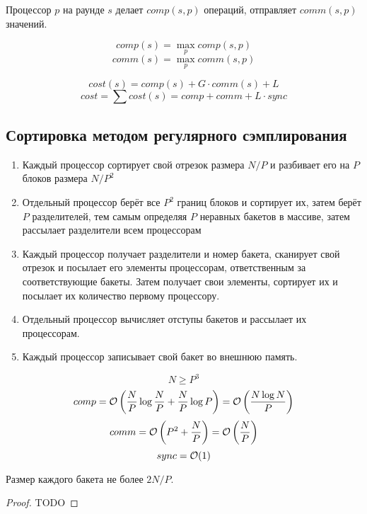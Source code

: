 Процессор $p$ на раунде $s$
делает $comp(s, p)$ операций,
отправляет $comm(s, p)$ значений.

\[ comp(s) = \max_p comp(s, p) \]
\[ comm(s) = \max_p comm(s, p) \]

\[ cost(s) = comp(s) + G \cdot comm(s) + L \]
\[ cost = \sum cost(s) = comp + comm + L \cdot sync \]

\subsection{Сортировка методом регулярного сэмплирования}
\begin{enumerate}
    \item Каждый процессор сортирует свой отрезок размера $N / P$
    и разбивает его на $P$ блоков размера $N / P^2$
    \item Отдельный процессор берёт все
    $P^2$ границ блоков и сортирует их,
    затем берёт $P$ разделителей, тем самым определяя
    $P$ неравных бакетов в массиве,
    затем рассылает разделители всем процессорам
    \item Каждый процессор получает разделители
    и номер бакета, сканирует свой отрезок
    и посылает его элементы процессорам, ответственным
    за соответствующие бакеты.
    Затем получает свои элементы, сортирует их
    и посылает их количество первому процессору.
    \item Отдельный процессор вычисляет
    отступы бакетов и рассылает их процессорам.
    \item Каждый процессор записывает свой бакет
    во внешнюю память.
\end{enumerate}

\[ N \ge P^3 \]
\[
    comp
    = \mathcal{O} \left( \frac{N}{P} \log \frac{N}{P} + \frac{N}{P} \log P \right)
    = \mathcal{O} \left( \frac{N \log N}{P} \right)
\]
\[
    comm
    = \mathcal{O} \left( P^2 + \frac{N}{P} \right)
    = \mathcal{O} \left( \frac{N}{P} \right)
\]
\[ sync = \mathcal{O}(1) \]

\begin{theorem}
    Размер каждого бакета не более $2N / P$.
\end{theorem}
\begin{proof}
    TODO
\end{proof}
